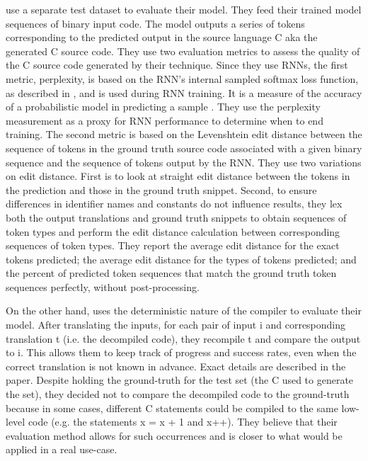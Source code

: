 \documentclass{article}
\begin{document}
\citet{katz2018using} use a separate test dataset to evaluate their model. They feed their trained model sequences of binary input code. The model outputs a series of tokens corresponding to the predicted output in the source language C aka the generated C source code. They use two evaluation metrics to assess the quality of the C source code generated by their technique. Since they use RNNs, the first metric, perplexity, is based on the RNN’s internal sampled softmax loss function, as described in \citet{jean2014using}, and is used during RNN training. It is a measure of the accuracy of a probabilistic model in predicting a sample \cite{shannon2001mathematical}. They use the perplexity measurement as a proxy for RNN performance to determine when to end training. The second metric is
based on the Levenshtein edit distance between the sequence of tokens in the ground truth source code associated with a given binary sequence and the sequence of tokens output by the RNN. They use two variations on edit distance. First is to look at straight edit distance between the tokens in the prediction and those in the ground truth snippet. Second, to ensure differences in identifier names and constants do not influence results, they lex both the output translations and ground truth snippets to obtain sequences of token types and perform the edit distance calculation between corresponding sequences of token types. They report the average edit distance for the exact tokens predicted; the average edit distance for the types of tokens predicted; and the percent of predicted token sequences that match the ground truth token sequences perfectly, without post-processing.

On the other hand, \citet{katz2019towards} uses the deterministic nature of the compiler to evaluate their model. After translating the inputs, for each pair of input i and corresponding translation t (i.e. the decompiled code), they recompile t and compare the output to i. This allows them to keep track of progress and success rates, even when the correct translation is not known in advance. Exact details are described in the paper. Despite holding the ground-truth for the test set (the C used to generate the set), they decided not to compare the decompiled code to the ground-truth because in some cases, different C statements could be compiled to the same low-level code (e.g. the statements x = x + 1 and x++). They believe that their evaluation method allows for such occurrences and is closer to what would be applied in a real use-case.
\end{document}
